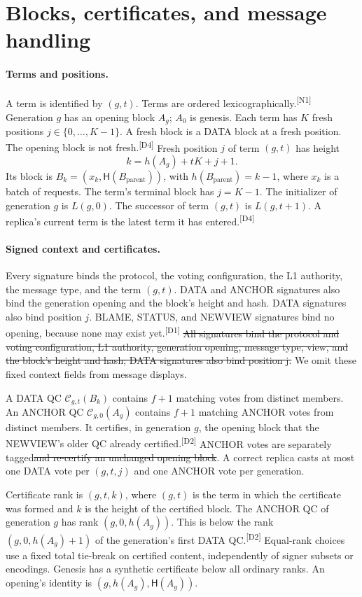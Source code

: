 \documentclass[11pt,a4paper]{article}
\newcommand{\NEW}[1]{{\color{diffNew}#1}}
\newcommand{\DEL}[1]{{\color{diffDel}\sout{#1}}}
\newcommand{\CH}[1]{\textsuperscript{\color{diffNew}\sffamily\scriptsize[#1]}}
\newcommand{\NEW}[1]{#1}
\newcommand{\DEL}[1]{}
\newcommand{\CH}[1]{}
\newcommand{\QC}{\mathcal C}
\newcommand{\Hash}{\mathsf H}
\newcounter{protocol}
\begin{document}
\section{Blocks, certificates, and message handling}
\label{sec:definitions}
\paragraph{Terms and positions.}
A \NEW{term is identified by} $(g,t)$\NEW{. Terms are} ordered
lexicographically.\CH{N1} Generation $g$ has an opening block $A_g$; $A_0$
is genesis. \NEW{Each term has $K$ fresh positions $j\in\{0,\ldots,K-1\}$.
A fresh block is a DATA block at a fresh position. The opening block is not
fresh.}\CH{D4} Fresh position $j$ of term $(g,t)$ has height
\[
 k=h(A_g)+tK+j+1.
\]
Its block is $B_k=(x_k,\Hash(B_{\mathrm{parent}}))$, with
$h(B_{\mathrm{parent}})=k-1$\NEW{, where $x_k$ is a batch of requests}.
The term's terminal block has $j=K-1$.
\NEW{The initializer of generation $g$ is $L(g,0)$. The successor of term
$(g,t)$ is $L(g,t+1)$. A replica's current term is the latest term it has
entered.}\CH{D4}

\paragraph{Signed context and certificates.}
\NEW{Every signature binds the protocol, the voting configuration, the L1
authority, the message type, and the term $(g,t)$. DATA and ANCHOR
signatures also bind the generation opening and the block's height and
hash. DATA signatures also bind position $j$. BLAME, STATUS, and NEWVIEW
signatures bind no opening, because none may exist yet.}\CH{D1}
\DEL{All signatures bind the protocol and voting configuration, L1
authority, generation opening, message type, view, and the block's height
and hash; DATA signatures also bind position j.} We omit these fixed
context fields from message displays.

A DATA QC $\QC_{g,t}(B_k)$ contains $f+1$ matching votes from distinct
members. \NEW{An ANCHOR QC $\QC_{g,0}(A_g)$ contains $f+1$ matching ANCHOR
votes from distinct members. It certifies, in generation $g$, the opening
block that the NEWVIEW's older QC already certified.}\CH{D2}
ANCHOR votes are separately tagged\DEL{and re-certify an unchanged opening
block}. A correct replica casts at most one DATA vote per $(g,t,j)$ and one
ANCHOR vote per generation.

Certificate rank is $(g,t,k)$\NEW{, where $(g,t)$ is the term in which the
certificate was formed and $k$ is the height of the certified block. The
ANCHOR QC of generation $g$ has rank $(g,0,h(A_g))$. This is below the rank
$(g,0,h(A_g)+1)$ of the generation's first DATA QC.}\CH{D2}
Equal-rank choices use a fixed total tie-break on certified content,
independently of signer subsets or encodings. Genesis has a synthetic
certificate below all ordinary ranks. An opening's identity is
$(g,h(A_g),\Hash(A_g))$.
\end{document}
